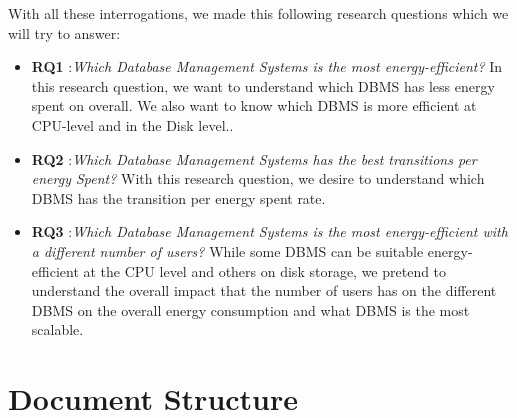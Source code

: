 With all these interrogations, we made this following research questions which we will try to answer:


\begin{itemize}
  \item \textbf{RQ1} :\textit{Which Database Management Systems is the most energy-efficient?}
In this research question, we want to understand which DBMS has less energy spent on overall. We also want to know which DBMS is more efficient at CPU-level and in the Disk level.. 
 \item \textbf{RQ2} :\textit{Which Database Management Systems has the best transitions per energy Spent?}
 With this research question, we desire to understand which DBMS has the transition per energy spent rate.
  \item \textbf{RQ3} :\textit{Which Database Management Systems is the most energy-efficient with a different number of users?}
While some DBMS can be suitable energy-efficient at the CPU level and others on disk storage, we pretend to understand the overall impact that the number of users has on the different DBMS on the overall energy consumption and what DBMS is the most scalable.
\end{itemize}

\section{Document Structure}